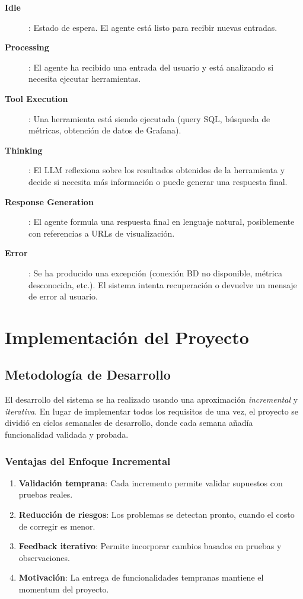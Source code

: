 \documentclass[11pt, a4paper]{report}
\begin{document}
\begin{description}
    \item[\textbf{Idle}]: Estado de espera. El agente está listo para recibir nuevas entradas.
    
    \item[\textbf{Processing}]: El agente ha recibido una entrada del usuario y está analizando si necesita ejecutar herramientas.
    
    \item[\textbf{Tool Execution}]: Una herramienta está siendo ejecutada (query SQL, búsqueda de métricas, obtención de datos de Grafana).
    
    \item[\textbf{Thinking}]: El LLM reflexiona sobre los resultados obtenidos de la herramienta y decide si necesita más información o puede generar una respuesta final.
    
    \item[\textbf{Response Generation}]: El agente formula una respuesta final en lenguaje natural, posiblemente con referencias a URLs de visualización.
    
    \item[\textbf{Error}]: Se ha producido una excepción (conexión BD no disponible, métrica desconocida, etc.). El sistema intenta recuperación o devuelve un mensaje de error al usuario.
\end{description}

\section{Implementación del Proyecto}

\subsection{Metodología de Desarrollo}

El desarrollo del sistema se ha realizado usando una aproximación \textit{incremental} y \textit{iterativa}. En lugar de implementar todos los requisitos de una vez, el proyecto se dividió en ciclos semanales de desarrollo, donde cada semana añadía funcionalidad validada y probada.

\subsubsection{Ventajas del Enfoque Incremental}

\begin{enumerate}
    \item \textbf{Validación temprana}: Cada incremento permite validar supuestos con pruebas reales.
    \item \textbf{Reducción de riesgos}: Los problemas se detectan pronto, cuando el costo de corregir es menor.
    \item \textbf{Feedback iterativo}: Permite incorporar cambios basados en pruebas y observaciones.
    \item \textbf{Motivación}: La entrega de funcionalidades tempranas mantiene el momentum del proyecto.
\end{enumerate}
\end{document}

